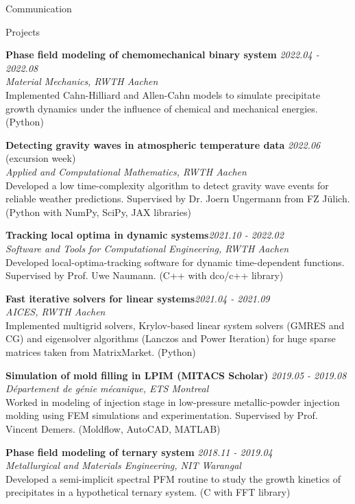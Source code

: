 \documentclass{resume}
\begin{document}
  \begin{rSection}{Communication} \itemsep -4pt
    \item {}
    \item {}
    \item {}
  \end{rSection}
  
  \begin{rSection}{Projects} \itemsep -4pt
    \item {\bf Phase field modeling of chemomechanical binary system} \hfill {\em 2022.04 - 2022.08}\\
    {\em Material Mechanics, RWTH Aachen}\\
    Implemented Cahn-Hilliard and Allen-Cahn models to simulate precipitate growth dynamics under the influence of chemical and mechanical energies. (Python) 
    \item {\bf Detecting gravity waves in atmospheric temperature data} \hfill {\em2022.06} (excursion week)\\
    {\em Applied and Computational Mathematics, RWTH Aachen}\\
    Developed a low time-complexity algorithm to detect gravity wave events for reliable weather predictions. Supervised by Dr. Joern Ungermann from FZ Jülich. (Python with NumPy, SciPy, JAX libraries)
    \item {\bf Tracking local optima in dynamic systems}\hfill {\em 2021.10 - 2022.02}\\
    {\em Software and Tools for Computational Engineering, RWTH Aachen}\\
    Developed local-optima-tracking software for dynamic time-dependent functions. Supervised by Prof. Uwe Naumann. (C++ with dco/c++ library)
    \item {\bf Fast iterative solvers for linear systems}\hfill {\em 2021.04 - 2021.09}\\
    {\em AICES, RWTH Aachen}\\
    Implemented multigrid solvers, Krylov-based linear system solvers (GMRES and CG) and eigensolver algorithms (Lanczos and Power Iteration) for huge sparse matrices taken from MatrixMarket. (Python)
    \item {\bf Simulation of mold filling in LPIM (MITACS Scholar)} \hfill {\em 2019.05 - 2019.08}\\
    {\em Département de génie mécanique, ETS Montreal}\\
    Worked in modeling of injection stage in low-pressure metallic-powder injection molding using FEM simulations and experimentation. Supervised by Prof. Vincent Demers. (Moldflow, AutoCAD, MATLAB)
    \item {\bf Phase field modeling of ternary system} \hfill {\em 2018.11 - 2019.04}\\
    {\em Metallurgical and Materials Engineering, NIT Warangal}\\
    Developed a semi-implicit spectral PFM routine to study the growth kinetics of precipitates in a hypothetical ternary system. (C with FFT library)
  \end{rSection}
  
\end{document}
